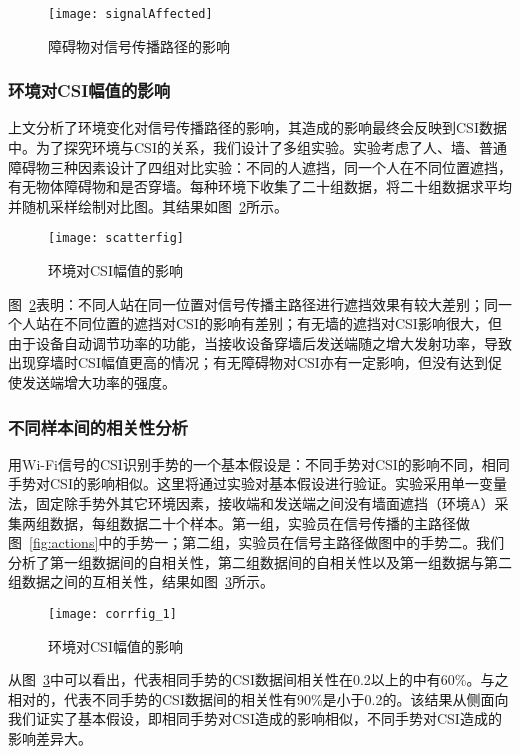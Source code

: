 \begin{figure}[htbp] %
  \centering
  \texttt{[image: signalAffected]}
  \caption{障碍物对信号传播路径的影响}
  \label{fig:signalAffected}
\end{figure}

\subsubsection{环境对CSI幅值的影响}
上文分析了环境变化对信号传播路径的影响，其造成的影响最终会反映到CSI数据中。为了探究环境与CSI的关系，我们设计了多组实验。实验考虑了人、墙、普通障碍物三种因素设计了四组对比实验：不同的人遮挡，同一个人在不同位置遮挡，有无物体障碍物和是否穿墙。每种环境下收集了二十组数据，将二十组数据求平均并随机采样绘制对比图。其结果如图~\ref{fig:scatterfig}所示。
\begin{figure}[htbp] %
  \centering
  \texttt{[image: scatterfig]}
  \caption{环境对CSI幅值的影响}
  \label{fig:scatterfig}
\end{figure}

图~\ref{fig:scatterfig}表明：不同人站在同一位置对信号传播主路径进行遮挡效果有较大差别；同一个人站在不同位置的遮挡对CSI的影响有差别；有无墙的遮挡对CSI影响很大，但由于设备自动调节功率的功能，当接收设备穿墙后发送端随之增大发射功率，导致出现穿墙时CSI幅值更高的情况；有无障碍物对CSI亦有一定影响，但没有达到促使发送端增大功率的强度。

\subsubsection{不同样本间的相关性分析}
用Wi-Fi信号的CSI识别手势的一个基本假设是：不同手势对CSI的影响不同，相同手势对CSI的影响相似。这里将通过实验对基本假设进行验证。实验采用单一变量法，固定除手势外其它环境因素，接收端和发送端之间没有墙面遮挡（环境A）采集两组数据，每组数据二十个样本。第一组，实验员在信号传播的主路径做图~\ref{fig:actions}中的手势一；第二组，实验员在信号主路径做图中的手势二。我们分析了第一组数据间的自相关性，第二组数据间的自相关性以及第一组数据与第二组数据之间的互相关性，结果如图~\ref{fig:corrfig_1}所示。

\begin{figure}[htbp] %
  \centering
  \texttt{[image: corrfig\_1]}
  \caption{环境对CSI幅值的影响}
  \label{fig:corrfig_1}
\end{figure}

从图~\ref{fig:corrfig_1}中可以看出，代表相同手势的CSI数据间相关性在0.2以上的中有60\%。与之相对的，代表不同手势的CSI数据间的相关性有90\%是小于0.2的。该结果从侧面向我们证实了基本假设，即相同手势对CSI造成的影响相似，不同手势对CSI造成的影响差异大。

